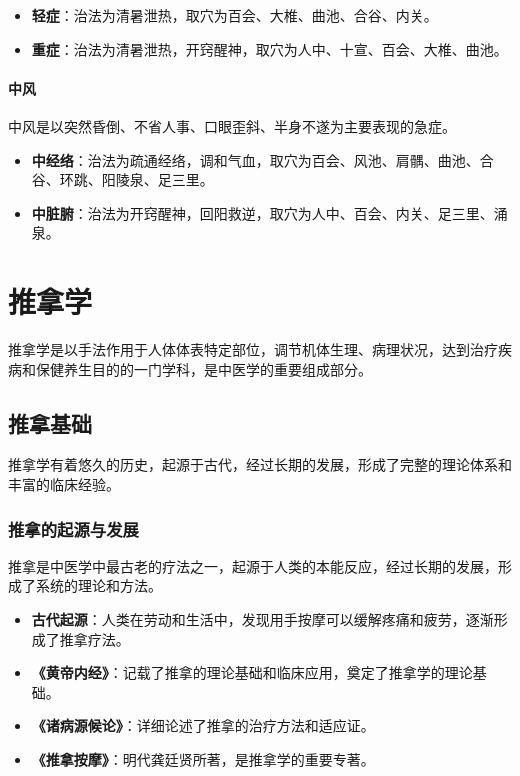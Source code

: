 \documentclass[12pt,UTF8]{ctexbook}
\begin{document}
\begin{itemize}
\item \textbf{轻症}：治法为清暑泄热，取穴为百会、大椎、曲池、合谷、内关。
\item \textbf{重症}：治法为清暑泄热，开窍醒神，取穴为人中、十宣、百会、大椎、曲池。
\end{itemize}

\subsubsection{中风}

中风是以突然昏倒、不省人事、口眼歪斜、半身不遂为主要表现的急症。

\begin{itemize}
\item \textbf{中经络}：治法为疏通经络，调和气血，取穴为百会、风池、肩髃、曲池、合谷、环跳、阳陵泉、足三里。
\item \textbf{中脏腑}：治法为开窍醒神，回阳救逆，取穴为人中、百会、内关、足三里、涌泉。
\end{itemize}

\chapter{推拿学}

推拿学是以手法作用于人体体表特定部位，调节机体生理、病理状况，达到治疗疾病和保健养生目的的一门学科，是中医学的重要组成部分。

\section{推拿基础}

推拿学有着悠久的历史，起源于古代，经过长期的发展，形成了完整的理论体系和丰富的临床经验。

\subsection{推拿的起源与发展}

推拿是中医学中最古老的疗法之一，起源于人类的本能反应，经过长期的发展，形成了系统的理论和方法。

\begin{itemize}
\item \textbf{古代起源}：人类在劳动和生活中，发现用手按摩可以缓解疼痛和疲劳，逐渐形成了推拿疗法。
\item \textbf{《黄帝内经》}：记载了推拿的理论基础和临床应用，奠定了推拿学的理论基础。
\item \textbf{《诸病源候论》}：详细论述了推拿的治疗方法和适应证。
\item \textbf{《推拿按摩》}：明代龚廷贤所著，是推拿学的重要专著。
\end{itemize}
\end{document}

